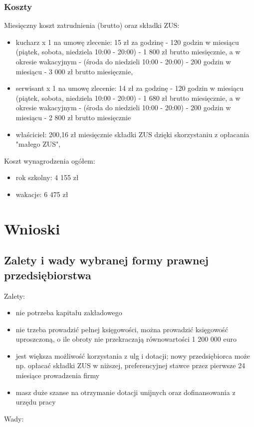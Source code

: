 \documentclass{sprawozdanie-agh}
\begin{document}
		\subsubsection{Koszty}
		Miesięczny koszt zatrudnienia (brutto) oraz składki ZUS:
		\begin{itemize}
			\item kucharz x 1 na umowę zlecenie: 15 zł za godzinę - 120 godzin w miesiącu (piątek, sobota, niedziela 10:00 - 20:00) - 1 800 zł brutto miesięcznie, a w okresie wakacyjnym - (środa do niedzieli 10:00 - 20:00) - 200 godzin w miesiącu - 3 000 zł brutto miesięcznie,
			\item serwisant x 1 na umowę zlecenie: 14 zł za godzinę - 120 godzin w miesiącu (piątek, sobota, niedziela 10:00 - 20:00) - 1 680 zł brutto miesięcznie, a w okresie wakacyjnym - (środa do niedzieli 10:00 - 20:00) - 200 godzin w miesiącu - 2 800 zł brutto miesięcznie
			\item właściciel: 200,16 zł miesięcznie składki ZUS dzięki skorzystaniu z opłacania "małego ZUS",
		\end{itemize}
		Koszt wynagrodzenia ogółem:
		\begin{itemize}
			\item rok szkolny: 4 155 zł
			\item wakacje: 6 475 zł
		\end{itemize}

	\section{Wnioski} 

		\subsection{Zalety i wady wybranej formy prawnej przedsiębiorstwa}
 
		Zalety:

		\begin{itemize}
			\item nie potrzeba kapitału zakładowego
			\item nie trzeba prowadzić pełnej księgowości, można prowadzić księgowość uproszczoną, o ile obroty nie przekraczają równowartości 1 200 000 euro
			\item jest większa możliwość korzystania z ulg i dotacji; nowy przedsiębiorca może np. opłacać składki ZUS w niższej, preferencyjnej stawce przez pierwsze 24 miesiące prowadzenia firmy
			\item masz duże szanse na otrzymanie dotacji unijnych oraz dofinansowania z urzędu pracy
		\end{itemize}
		Wady:
\end{document}
